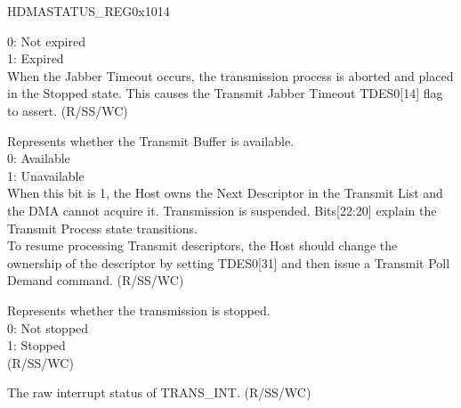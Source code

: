 \begin{register}{H}{DMASTATUS\_REG}{0x1014}
\begin{regdesc}
\begin{reglist}
0: Not expired\\
1: Expired\\
When the Jabber Timeout occurs, the transmission process is aborted and placed in the Stopped state. This causes the Transmit Jabber Timeout TDES0[14] flag to assert. (R/SS/WC)
\item [TRANS\_BUF\_UNAVAIL]  Represents whether the Transmit Buffer is available.\\
0: Available\\
1: Unavailable\\
When this bit is 1, the Host owns the Next Descriptor in the Transmit List and the DMA cannot acquire it. Transmission is suspended. Bits[22:20] explain the Transmit Process state transitions. \\
To resume processing Transmit descriptors, the Host should change the ownership of the descriptor by setting TDES0[31] and then issue a Transmit Poll Demand command. (R/SS/WC)
\item [TRANS\_PROC\_STOP] Represents whether the transmission is stopped.\\
0: Not stopped\\
1: Stopped\\(R/SS/WC)
\item [TRANS\_INT] The raw interrupt status of TRANS\_INT. (R/SS/WC)
\end{reglist}\end{regdesc}
\end{register}


